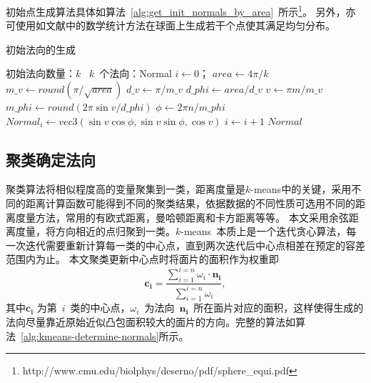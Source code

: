 初始点生成算法具体如算法~\ref{alg:get_init_normals_by_area}~所示\footnote{http://www.cmu.edu/biolphys/deserno/pdf/sphere\_equi.pdf}。
另外，亦可使用如文献中的数学统计方法在球面上生成若干个点使其满足均匀分布。

\begin{algorithm}[htbp]
\small
\caption{初始法向的生成}
\label{alg:get_init_normals_by_area}
\begin{algorithmic}[1]
\REQUIRE
初始法向数量：$k$
\ENSURE
~$k$~个法向：Normal
\STATE $i \gets 0$； $area \leftarrow 4\pi / k$
\STATE $m\_v \gets round(\pi/\sqrt{area})$
\STATE $d\_v \gets \pi/m\_v$
\STATE $d\_phi \gets area/d\_v$
    \STATE $v \gets \pi m/m\_v$
    \STATE $m\_phi \gets round(2\pi\sin{v}/d\_phi)$
        \STATE $\phi \gets 2\pi n/m\_phi$
        \STATE $Normal_i \gets vec3(\sin{v}\cos{\phi},\sin{v}\sin{\phi},\cos{v})$
        \STATE $i \gets i+1$
    \ENDFOR
\ENDFOR
\RETURN $Normal$
\end{algorithmic}
\end{algorithm}

 
\subsection{聚类确定法向}
\label{subsec:determ-normals}

聚类算法将相似程度高的变量聚集到一类，距离度量是$k$-means中的关键，采用不同的距离计算函数可能得到不同的聚类结果，依据数据的不同性质可选用不同的距离度量方法，常用的有欧式距离，曼哈顿距离和卡方距离等等。
本文采用余弦距离度量，将方向相近的点归聚到一类。$k$-means~本质上是一个迭代贪心算法，每一次迭代需要重新计算每一类的中心点，直到两次迭代后中心点相差在预定的容差范围内为止。
本文聚类更新中心点时将面片的面积作为权重即
\begin{equation}
\label{equ:kmeans-update-center}
\bm{c_i}=\frac{\sum_{i=1}^{i=n} \omega_i \cdot \bm{n_i} } {\sum_{i=1}^{i=n} \omega_i}
,
\end{equation}
其中$\bm{c_i}$
为第~$i$~类的中心点，$\omega_i$~为法向~$\bm{n_i}$~所在面片对应的面积，这样使得生成的法向尽量靠近原始近似凸包面积较大的面片的方向。完整的算法如算法~\ref{alg:kmeans-determine-normals}所示。

